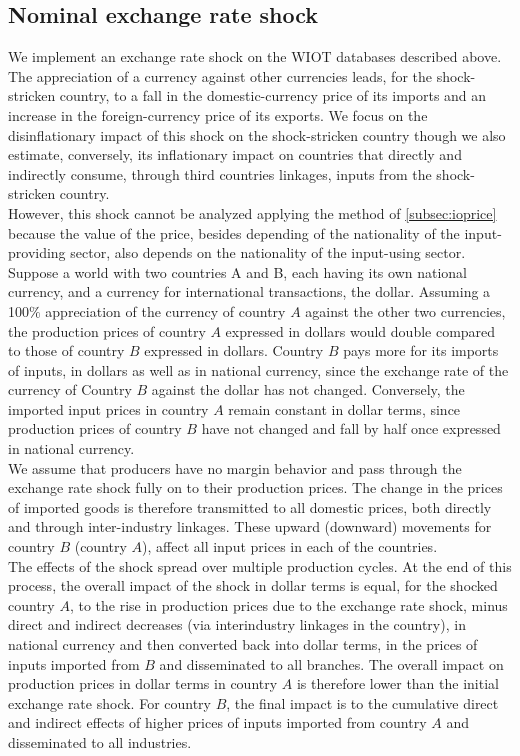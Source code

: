 \documentclass[11pt,a4paper]{article}
\begin{document}
\subsection{Nominal exchange rate shock}
\label{subsec:chocchange}

We implement an exchange rate shock on the WIOT databases described above. 
The appreciation of a currency against other currencies leads, for the shock-stricken country, to a fall in the domestic-currency price of its imports and an increase in the foreign-currency price of its exports. We focus on the disinflationary impact of this shock on the shock-stricken country though we also estimate, conversely, its inflationary impact on countries that directly and indirectly consume, through third countries linkages, inputs from the shock-stricken country.\\
However, this shock cannot be analyzed applying the method of \ref{subsec:ioprice} because the value of the price, besides depending of the nationality of the input-providing sector, also depends on the nationality of the input-using sector.  Suppose a world with two countries A and B, each having its own national currency, and a currency for international transactions, the dollar.
Assuming a 100$\%$ appreciation of the currency of country $A$ against the other two currencies, the production prices of country $A$ expressed in dollars would double compared to those of country $B$ expressed in dollars. Country $B$ pays more for its imports of inputs, in dollars as well as in national currency, since the exchange rate of the currency of Country $B$ against the dollar has not changed. Conversely, the imported input prices in country $A$ remain constant in dollar terms, since production prices of country $B$ have not changed and fall by half once expressed in national currency.\\
We assume that producers have no margin behavior and pass through the exchange rate shock fully on to their production prices. The change in the prices of imported goods is therefore transmitted to all domestic prices, both directly and through inter-industry linkages. These upward (downward) movements for country $B$ (country $A$), affect all input prices in each of the countries.\\
The effects of the shock spread over multiple production cycles. At the end of this process, the overall impact of the shock in dollar terms is equal, for the shocked country $A$, to the rise in production prices due to the exchange rate shock, minus direct and indirect decreases (via interindustry linkages in the country), in national currency and then converted back into dollar terms, in the prices of inputs imported from $B$ and disseminated to all branches. The overall impact on production prices in dollar terms in country $A$ is therefore lower than the initial exchange rate shock. For country $B$, the final impact is to the cumulative direct and indirect effects of higher prices of inputs imported from country $A$ and disseminated to all industries.\\
\end{document}
